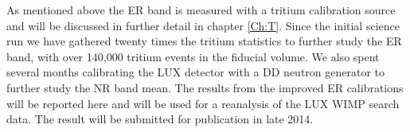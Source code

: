 \newpage

As mentioned above the ER band is measured with a tritium calibration source and will be discussed in further detail in chapter \ref{Ch:T}. Since the initial science run we have gathered twenty times the tritium statistics to further study the ER band, with over 140,000 tritium events in the fiducial volume. We also spent several months calibrating the LUX detector with a DD neutron generator to further study the NR band mean. The results from the improved ER calibrations will be reported here and will be used for a reanalysis of the LUX WIMP search data. The result will be submitted for publication in late 2014. 
